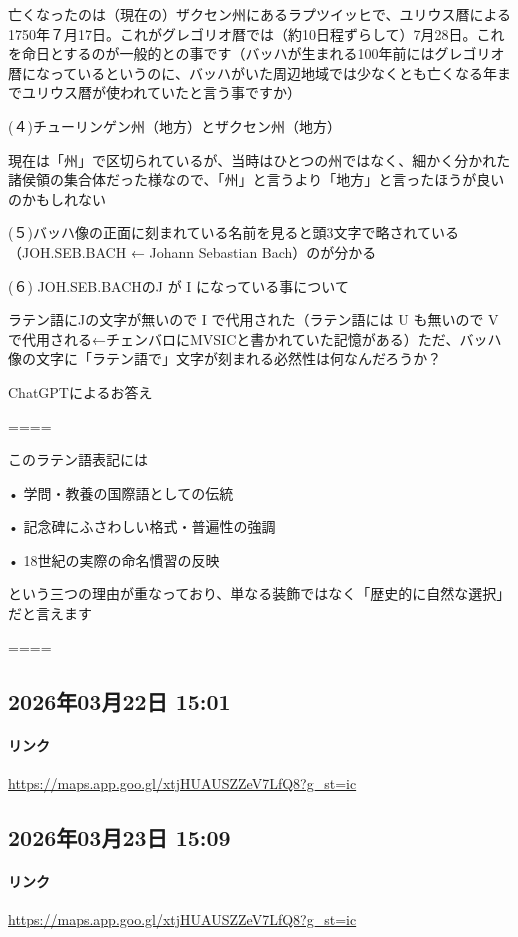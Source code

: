 亡くなったのは（現在の）ザクセン州にあるラプツイッヒで、ユリウス暦による1750年７月17日。これがグレゴリオ暦では（約10日程ずらして）7月28日。これを命日とするのが一般的との事です（バッハが生まれる100年前にはグレゴリオ暦になっているというのに、バッハがいた周辺地域では少なくとも亡くなる年までユリウス暦が使われていたと言う事ですか）

(４)チューリンゲン州（地方）とザクセン州（地方）

現在は「州」で区切られているが、当時はひとつの州ではなく、細かく分かれた諸侯領の集合体だった様なので、「州」と言うより「地方」と言ったほうが良いのかもしれない

(５)バッハ像の正面に刻まれている名前を見ると頭3文字で略されている（JOH.SEB.BACH ← Johann Sebastian Bach）のが分かる

(６) JOH.SEB.BACHのJ が I になっている事について

ラテン語にJの文字が無いので I で代用された（ラテン語には U も無いので V で代用される←チェンバロにMVSICと書かれていた記憶がある）ただ、バッハ像の文字に「ラテン語で」文字が刻まれる必然性は何なんだろうか？

ChatGPTによるお答え

====

このラテン語表記には

• 学問・教養の国際語としての伝統

• 記念碑にふさわしい格式・普遍性の強調

• 18世紀の実際の命名慣習の反映

という三つの理由が重なっており、単なる装飾ではなく「歴史的に自然な選択」だと言えます

====

\subsection*{2026年03月22日 15:01}

\paragraph{リンク}
\url{https://maps.app.goo.gl/xtjHUAUSZZeV7LfQ8?g_st=ic}

\subsection*{2026年03月23日 15:09}

\paragraph{リンク}
\url{https://maps.app.goo.gl/xtjHUAUSZZeV7LfQ8?g_st=ic}

